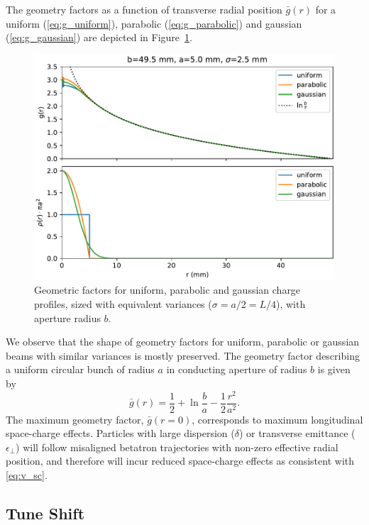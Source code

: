 The geometry factors as a function of transverse radial position $\bar{g}(r)$ for a uniform (\ref{eq:g_uniform}), parabolic (\ref{eq:g_parabolic}) and gaussian (\ref{eq:g_gaussian}) are depicted in Figure~\ref{fig:geometry_factors}.
\begin{figure}
    \centering
    \includegraphics{./figs/geometric_factors.pdf}
    \caption{Geometric factors for uniform, parabolic and gaussian charge profiles, sized with equivalent variances ($\sigma = a/2 = L/4$), with aperture radius $b$.}
    \label{fig:geometry_factors}
\end{figure}
We observe that the shape of geometry factors for uniform, parabolic or gaussian beams with similar variances is mostly preserved. The geometry factor describing a uniform circular bunch of radius $a$ in conducting aperture of radius $b$ is given by $$\bar{g}(r)=\frac{1}{2}+\ln\frac{b}{a}-\frac{1}{2}\frac{r^2}{a^2}.$$
The maximum geometry factor, $\bar{g}(r=0)$, corresponds to maximum longitudinal space-charge effects. Particles with large dispersion ($\delta$) or transverse emittance ($\epsilon_\perp$) will follow misaligned betatron trajectories with non-zero effective radial position, and therefore will incur reduced space-charge effects as consistent with \eqref{eq:v_sc}.

\subsection{Tune Shift}

